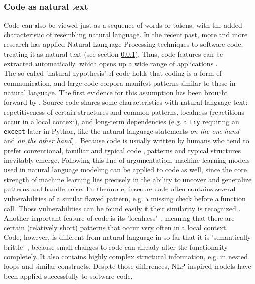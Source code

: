 \documentclass[
	a4paper,
	pagesize,
	pdftex,
	12pt,
	twoside, %
	BCOR=5mm, %
	ngerman,
	fleqn,
	final,
	]{scrartcl}
\begin{document}
\subsubsection{Code as natural text}\label{Natural-Hypothesis}\label{Semantically-Brittle}
Code can also be viewed just as a sequence of words or tokens, with the added characteristic of resembling natural language. In the recent past, more and more research has applied Natural Language Processing techniques to software code, treating it as natural text (see section \ref{Natural-Hypothesis}). Thus, code features can be extracted automatically, which opens up a wide range of applications \cite{Dam.2017}.\\
The so-called 'natural hypothesis' of code holds that coding is a form of communication, and large code corpora manifest patterns similar to those in natural language. The first evidence for this assumption has been brought forward by \cite{Hindle.2012}.
Source code shares some characteristics with natural language text: repetitiveness of certain structures and common patterns, localness (repetitions occur in a local context), and long-term dependencies (e.g. a \texttt{try} requiring an \texttt{except} later in Python, like the natural language statements \textit{on the one hand} and \textit{on the other hand}) \cite{Dam.2016}.
Because code is usually written by humans who tend to prefer conventional, familiar and typical code \cite{Allamanis.2018}, patterns and typical structures inevitably emerge. Following this line of argumentation, machine learning models used in natural language modeling can be applied to code as well, since the core strength of machine learning lies precisely in the ability to uncover and generalize patterns and handle noise. Furthermore, insecure code often contains several vulnerabilities of a similar flawed pattern, e.g. a missing check before a function call. Those vulnerabilities can be found easily if their similarity is recognized \cite{Yamaguchi.2012}. 
Another important feature of code is its 'localness'~\cite{Tu.2014}, meaning that there are certain (relatively short) patterns that occur very often in a local context.\\ 
Code, however, is different from natural language in so far that it is 'semantically brittle' \cite{Allamanis.2018}, because small changes to code can already alter the functionality completely. It also contains highly complex structural information, e.g. in nested loops and similar constructs. Despite those differences, NLP-inspired models have been applied successfully to software code.
\end{document}
